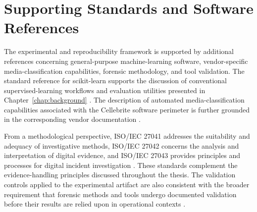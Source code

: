 \section{Supporting Standards and Software References}
\label{sec:appendix-supporting-reference-framework}

The experimental and reproducibility framework is supported by additional
references concerning general-purpose machine-learning software, vendor-specific
media-classification capabilities, forensic methodology, and tool validation.
The standard reference for scikit-learn supports the discussion of conventional
supervised-learning workflows and evaluation utilities presented in
Chapter~\ref{chap:background} \cite{pedregosa2011scikit}. The description of
automated media-classification capabilities associated with the Cellebrite
software perimeter is further grounded in the corresponding vendor documentation
\cite{cellebrite_media_classification}.

From a methodological perspective, ISO/IEC 27041 addresses the suitability and
adequacy of investigative methods, ISO/IEC 27042 concerns the analysis and
interpretation of digital evidence, and ISO/IEC 27043 provides principles and
processes for digital incident investigation
\cite{iso27041,iso27042,iso27043}. These standards complement the evidence-handling
principles discussed throughout the thesis. The validation controls applied to
the experimental artifact are also consistent with the broader requirement that
forensic methods and tools undergo documented validation before their results are
relied upon in operational contexts \cite{swgde2014validation}.
